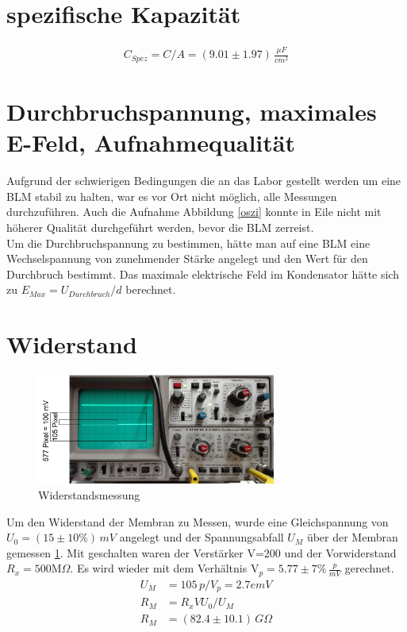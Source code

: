 \documentclass{include/thesisclass3}
\newcommand{\e}[1]{\,\si{#1}}
\begin{document}
\section{spezifische Kapazität}
\begin{align}
C_{Spez}=C/A=(9.01 \pm 1.97)\e{\frac{\mu F}{cm^2}}
\end{align}
\section{Durchbruchspannung, maximales E-Feld, Aufnahmequalität}
Aufgrund der schwierigen Bedingungen die an das Labor gestellt werden um eine BLM stabil zu halten, war es vor Ort nicht möglich, alle Messungen durchzuführen. Auch die Aufnahme Abbildung \ref{oszi} konnte in Eile nicht mit höherer Qualität durchgeführt werden, bevor die BLM zerreist.\\
Um die Durchbruchspannung zu bestimmen, hätte man auf eine BLM eine Wechselspannung von zunehmender Stärke angelegt und den Wert für den Durchbruch bestimmt. Das maximale elektrische Feld im Kondensator hätte sich zu $E_{Max}=U_{Durchbruch}/d$ berechnet.
\section{Widerstand}
\begin{figure}[ht]
	\begin{center}
		\includegraphics[width=0.7\textwidth]{images/Widerstand.png}
		\caption{Widerstandsmessung}
		\label{resistance}
	\end{center}
\end{figure}
Um den Widerstand der Membran zu Messen, wurde eine Gleichspannung von $U_0=(15 \pm 10\%)\e{mV}$ angelegt und der Spannungsabfall $U_M$ über der Membran gemessen \ref{resistance}. Mit geschalten waren der Verstärker V=200 und der Vorwiderstand $R_x=500\text{M}\Omega$. Es wird wieder mit dem Verhältnis V$_p=5.77 \pm 7\% \e{\frac{p}{mV}}$ gerechnet.
\begin{align*}
	U_M&= 105\e{p}/V_p= 2.7 e{mV}\\
	R_M&=R_x V U_0 /U_M\\
	R_M&=(82.4 \pm 10.1)\e{G\Omega}
\end{align*}
\end{document}
